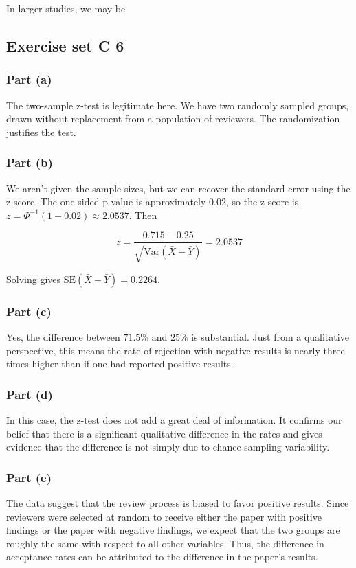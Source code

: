 \documentclass[11pt]{article}
\newcommand{\var}{\textrm{Var}}
\begin{document}
In larger studies, we may be 







\subsection*{Exercise set C 6} %
\subsubsection*{Part (a)}
The two-sample z-test is legitimate here.  We have two randomly sampled groups, drawn without replacement from a population of reviewers.  The randomization justifies the test.

\subsubsection*{Part (b)}
We aren't given the sample sizes, but we can recover the standard error using the z-score.  The one-sided p-value is approximately $0.02$, so the z-score is $z = \Phi^{-1}(1 - 0.02) \approx 2.0537$.  Then

$$ z = \frac{0.715 - 0.25}{\sqrt{\var(\bar{X} - \bar{Y})}} = 2.0537$$

Solving gives $\text{SE}(\bar{X} - \bar{Y}) = 0.2264$.

\subsubsection*{Part (c)}
Yes, the difference between $71.5\%$ and $25\%$ is substantial.  Just from a qualitative perspective, this means the rate of rejection with negative results is nearly three times higher than if one had reported positive results.


\subsubsection*{Part (d)}
In this case, the z-test does not add a great deal of information.  It confirms our belief that there is a significant qualitative difference in the rates and gives evidence that the difference is not simply due to chance sampling variability.

\subsubsection*{Part (e)}
The data suggest that the review process is biased to favor positive results.  Since reviewers were selected at random to receive either the paper with positive findings or the paper with negative findings, we expect that the two groups are roughly the same with respect to all other variables.  Thus, the difference in acceptance rates can be attributed to the difference in the paper's results.
\end{document}
